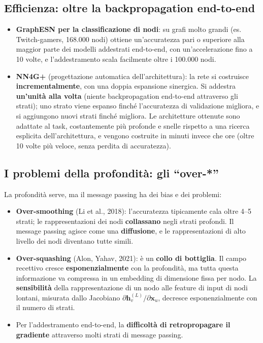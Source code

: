 \subsection{Efficienza: oltre la backpropagation
end-to-end}\label{efficienza-oltre-la-backpropagation-end-to-end}

\begin{itemize}
\tightlist
\item
  \textbf{GraphESN per la classificazione di nodi}: su grafi molto
  grandi (es. Twitch-gamers, 168.000 nodi) ottiene un'accuratezza pari o
  superiore alla maggior parte dei modelli addestrati end-to-end, con
  un'accelerazione fino a 10 volte, e l'addestramento scala facilmente
  oltre i 100.000 nodi.
\item
  \textbf{NN4G+} (progettazione automatica dell'architettura): la rete
  si costruisce \textbf{incrementalmente}, con una doppia espansione
  sinergica. Si addestra \textbf{un'unità alla volta} (niente
  backpropagation end-to-end attraverso gli strati); uno strato viene
  espanso finché l'accuratezza di validazione migliora, e si aggiungono
  nuovi strati finché migliora. Le architetture ottenute sono adattate
  al task, costantemente più profonde e snelle rispetto a una ricerca
  esplicita dell'architettura, e vengono costruite in minuti invece che
  ore (oltre 10 volte più veloce, senza perdita di accuratezza).
\end{itemize}

\subsection{I problemi della profondità: gli
``over-*''}\label{i-problemi-della-profondituxe0-gli-over-}

La profondità serve, ma il message passing ha dei bias e dei problemi:

\begin{itemize}
\tightlist
\item
  \textbf{Over-smoothing} (Li et al., 2018): l'accuratezza tipicamente
  cala oltre 4--5 strati; le rappresentazioni dei nodi
  \textbf{collassano} negli strati profondi. Il message passing agisce
  come una \textbf{diffusione}, e le rappresentazioni di alto livello
  dei nodi diventano tutte simili.
\item
  \textbf{Over-squashing} (Alon, Yahav, 2021): è un \textbf{collo di
  bottiglia}. Il campo recettivo cresce \textbf{esponenzialmente} con la
  profondità, ma tutta questa informazione va compressa in un embedding
  di dimensione fissa per nodo. La \textbf{sensibilità} della
  rappresentazione di un nodo alle feature di input di nodi lontani,
  misurata dallo Jacobiano
  \(\partial\mathbf{h}_v^{(L)}/\partial\mathbf{x}_u\), decresce
  esponenzialmente con il numero di strati.
\item
  Per l'addestramento end-to-end, la \textbf{difficoltà di
  retropropagare il gradiente} attraverso molti strati di message
  passing.
\end{itemize}

